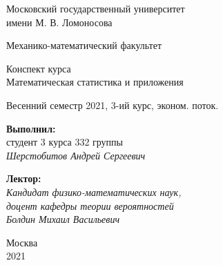 \begin{titlepage}
        
    \begin{center}
    Московский государственный университет\\
    имени М. В. Ломоносова\\
    
    \vspace{0.25 cm}
    
    \normalsize{Механико-математический факультет\\}
    \end{center}
    
    \vspace{6cm}
    
    \begin{center}
    \LARGE{Конспект курса\\ Математическая статистика и приложения} \\
        
    \vspace{0.5 cm}
    
    \normalsize{}
    Весенний семестр 2021, 3-ий курс, эконом. поток.
    \end{center}
    
    \vspace{3 cm}
    
    \begin{flushright}
    \textbf{Выполнил:}\\
    студент 3 курса
    332 группы\\
    
    \textit{Шерстобитов Андрей Сергеевич}\\
    
    \vspace{1 cm}
    
    \textbf{Лектор:}\\
    
    \textit{Кандидат физико-математических наук,\\ доцент кафедры теории вероятностей} \\
    \textit{Болдин Михаил Васильевич}
    \end{flushright}
            
    \vspace{\fill}
    \normalsize{}
    \begin{center}
    Москва\\2021
    \end{center}
    
    \thispagestyle{empty}
    \end{titlepage}